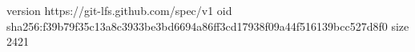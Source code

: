 version https://git-lfs.github.com/spec/v1
oid sha256:f39b79f35c13a8c3933be3bd6694a86ff3cd17938f09a44f516139bcc527d8f0
size 2421
